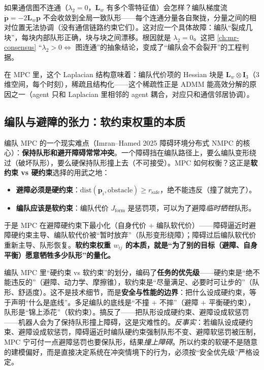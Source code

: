 \begin{insight}\label{ins:dmpc-disconnect}
如果通信图不连通（$\lambda_2=0$，$\mathbf{L}_w$ 有多个零特征值）会怎样？编队梯度流 $\dot{\mathbf{p}}=-2\mathbf{L}_w\mathbf{p}$ 不会收敛到全局一致队形——每个连通分量各自聚拢，分量之间的相对位置无法协调（没有通信链路约束它们）。这对应一个具体故障：编队“裂成几块”，每块内部队形正确，块与块之间漂移。根因就是 $\lambda_2=0$。这把 \cref{ch:mr-consensus} “$\lambda_2>0\iff$ 图连通”的抽象结论，变成了“编队会不会裂开”的工程判据。
\end{insight}

在 MPC 里，这个 Laplacian 结构意味着：编队代价项的 Hessian 块是 $\mathbf{L}_w\otimes \mathbf{I}_3$（$3$ 维空间，每个时刻），稀疏且结构化——这个稀疏性正是 ADMM 能高效分解的原因之一（agent 只和 Laplacian 里相邻的 agent 耦合，对应只和通信邻居协调）。

\subsection{编队与避障的张力：软约束权重的本质}
\label{sec:dmpc-obstacle}

编队 MPC 的一个现实难点（Imran--Hamed 2025 障碍环境分布式 NMPC\cite{imran2025obstacle} 的核心）：\textbf{保持队形和避开障碍常常冲突}。一个障碍挡在编队路径上，要么编队变形绕过（破坏队形），要么硬保持队形撞上去（不可接受）。MPC 如何权衡？这正是\textbf{软约束 vs 硬约束}选择的用武之地：
\begin{itemize}
  \item \textbf{避障必须是硬约束}：$\text{dist}(\mathbf{p}_i,\text{obstacle})\ge r_{\text{safe}}$，绝不能违反（撞了就完了）。
  \item \textbf{编队应该是软约束}：编队代价 $J_{\text{form}}$ 是惩罚项，可以为了避障\emph{临时牺牲}队形。
\end{itemize}
于是 MPC 在避障硬约束下最小化（自身代价 $+$ 编队软代价）——障碍逼近时避障硬约束主导、编队软代价被“暂时放弃”（队形变形绕障）；障碍过后编队软代价重新主导、队形恢复。\textbf{软约束权重 $w_{ij}$ 的本质，就是“为了别的目标（避障、自身平衡）愿意牺牲多少队形”的量化。}

\begin{insight}[约束的软硬划分本身就是一个安全决策]\label{ins:dmpc-soft-hard}
编队 MPC 里“硬约束 vs 软约束”的划分，编码了\textbf{任务的优先级}——硬约束是“绝不能违反的”（避障、动力学、摩擦锥），软约束是“尽量满足、必要时可让步的”（队形、舒适度）。这不是技术细节，而是\textbf{安全与性能的边界}：把什么设成硬约束，等于声明“什么是底线”。多足编队的底线是“不撞 $+$ 不摔”（避障 $+$ 平衡硬约束），队形是“锦上添花”（软约束）。搞反了——把队形设成硬约束、避障设成软惩罚——机器人会为了保持队形撞上障碍，这是灾难性的。\emph{反事实}：若编队设成硬约束、避障设成软惩罚，障碍逼近时编队硬约束强制队形不变、避障软惩罚被压制，MPC 宁可付一点避障惩罚也要保队形，结果\emph{撞上障碍}。所以约束的软硬不是随意的建模偏好，而是直接决定系统在冲突情境下的行为，必须按“安全优先级”严格设定。
\end{insight}

